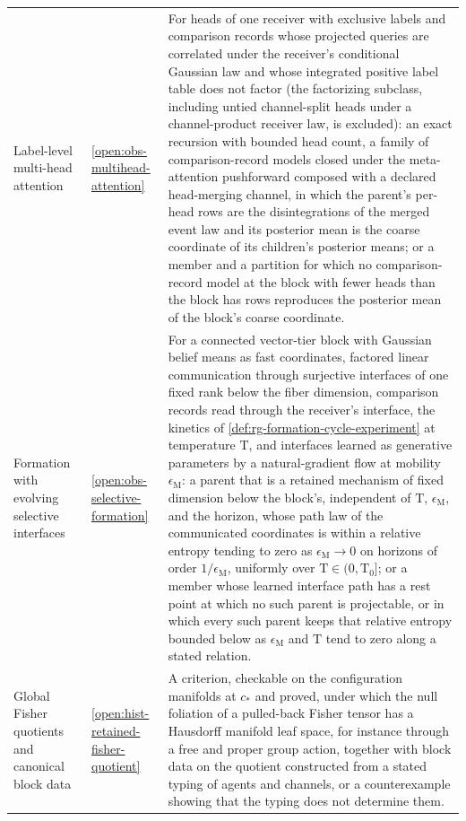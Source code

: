 {\begin{longtable}{@{}>{\raggedright\arraybackslash}p{}
>{\raggedright\arraybackslash}p{}
>{\raggedright\arraybackslash}p{}@{}}
Label-level multi-head attention & \cref{open:obs-multihead-attention} & For heads of one receiver with exclusive labels and comparison records whose projected queries are correlated under the receiver's conditional Gaussian law and whose integrated positive label table does not factor (the factorizing subclass, including untied channel-split heads under a channel-product receiver law, is excluded): an exact recursion with bounded head count, a family of comparison-record models closed under the meta-attention pushforward composed with a declared head-merging channel, in which the parent's per-head rows are the disintegrations of the merged event law and its posterior mean is the coarse coordinate of its children's posterior means; or a member and a partition for which no comparison-record model at the block with fewer heads than the block has rows reproduces the posterior mean of the block's coarse coordinate. \\
Formation with evolving selective interfaces & \cref{open:obs-selective-formation} & For a connected vector-tier block with Gaussian belief means as fast coordinates, factored linear communication through surjective interfaces of one fixed rank below the fiber dimension, comparison records read through the receiver's interface, the kinetics of \cref{def:rg-formation-cycle-experiment} at temperature $\mathrm T$, and interfaces learned as generative parameters by a natural-gradient flow at mobility $\epsilon_{\mathrm M}$: a parent that is a retained mechanism of fixed dimension below the block's, independent of $\mathrm T$, $\epsilon_{\mathrm M}$, and the horizon, whose path law of the communicated coordinates is within a relative entropy tending to zero as $\epsilon_{\mathrm M}\to0$ on horizons of order $1/\epsilon_{\mathrm M}$, uniformly over $\mathrm T\in(0,\mathrm T_0]$; or a member whose learned interface path has a rest point at which no such parent is projectable, or in which every such parent keeps that relative entropy bounded below as $\epsilon_{\mathrm M}$ and $\mathrm T$ tend to zero along a stated relation. \\
Global Fisher quotients and canonical block data & \cref{open:hist-retained-fisher-quotient} & A criterion, checkable on the configuration manifolds at $c_*$ and proved, under which the null foliation of a pulled-back Fisher tensor has a Hausdorff manifold leaf space, for instance through a free and proper group action, together with block data on the quotient constructed from a stated typing of agents and channels, or a counterexample showing that the typing does not determine them. \\

\end{longtable}}

